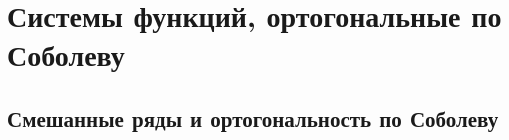 \chapter{Системы функций, ортогональные по Соболеву}
%
%

\section{Смешанные ряды и ортогональность по Соболеву}

